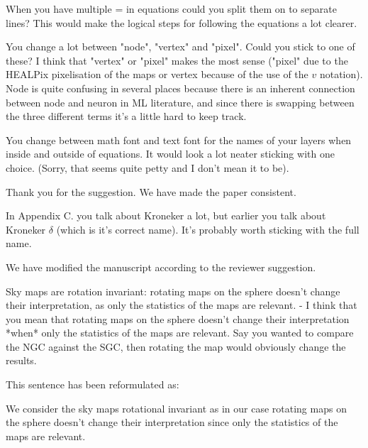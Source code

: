 \documentclass[12pt,a4paper]{article}
\newcommand{\nati}[1]{{\color[rgb]{.1,.6,.1}{NP: #1}}}
\newcommand{\todo}[1]{{\color[rgb]{.6,.1,.6}{TODO: #1}}}
\newcommand{\1}{\b{1}}              %
\newcommand{\0}{\b{0}}              %
\begin{document}
\begin{mdframed}[style=comment]
When you have multiple = in equations could you split them on to separate lines? This would make the logical steps for following the equations a lot clearer.
\end{mdframed}
\todo{Assigned: @tomek}
\nati{I personally think it is better without separating the lines}

\begin{mdframed}[style=comment]
You change a lot between "node", "vertex" and "pixel". Could you stick to one of these? I think that "vertex" or "pixel" makes the most sense ("pixel" due to the HEALPix pixelisation of the maps or vertex because of the use of the $v$ notation). Node is quite confusing in several places because there is an inherent connection between node and neuron in ML literature, and since there is swapping between the three different terms it's a little hard to keep track.
\end{mdframed}
\todo{Assigned: @all}
\nati{What do you think? This avoid repetition. But we could be more consistent...}


\begin{mdframed}[style=comment]
You change between math font and text font for the names of your layers when inside and outside of equations. It would look a lot neater sticking with one choice. (Sorry, that seems quite petty and I don't mean it to be).
\end{mdframed}
Thank you for the suggestion. We have made the paper consistent.
\nati{@all, when you read the paper, please check that I did not forget some of them. Every layer has been changed to math symbols as we use them like function. For example, SM becomes $SM$.}

\begin{mdframed}[style=comment]
In Appendix C. you talk about Kroneker a lot, but earlier you talk about Kroneker $\delta$ (which is it's correct name). It's probably worth sticking with the full name.
\end{mdframed}
We have modified the manuscript according to the reviewer suggestion.

\begin{mdframed}[style=comment]
Sky maps are rotation invariant: rotating maps on the sphere doesn’t change their interpretation, as only the statistics of the maps are relevant.
- I think that you mean that rotating maps on the sphere doesn't change their interpretation *when* only the statistics of the maps are relevant. Say you wanted to compare the NGC against the SGC, then rotating the map would obviously change the results.
\end{mdframed}
This sentence has been reformulated as:
\begin{mdframed}[style=manuscript]
We consider the sky maps rotational invariant as in our case rotating maps on the sphere doesn't change their interpretation since only the statistics of the maps are relevant.
\end{mdframed}
\end{document}
